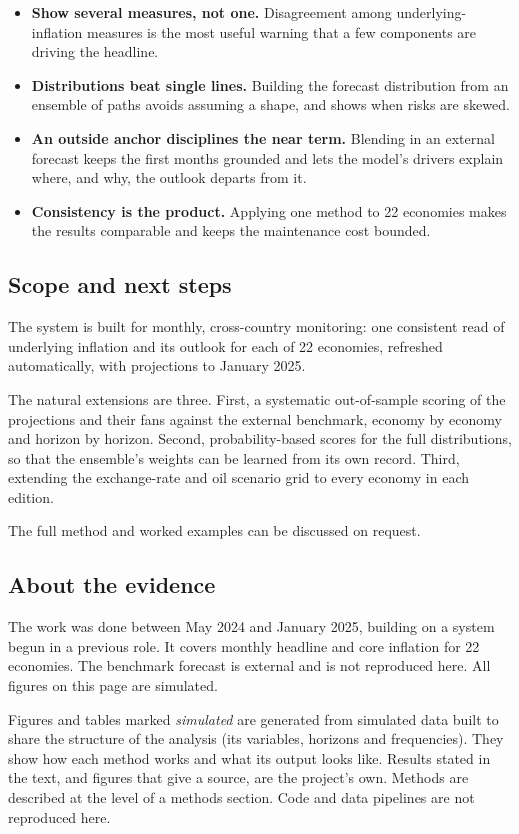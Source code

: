 \documentclass[
  british,
  a4paper,
]{article}
\providecommand{\tightlist}{%
  \setlength{\itemsep}{0pt}\setlength{\parskip}{0pt}}
\begin{document}
\begin{itemize}
\tightlist
\item
  \textbf{Show several measures, not one.} Disagreement among
  underlying-inflation measures is the most useful warning that a few
  components are driving the headline.
\item
  \textbf{Distributions beat single lines.} Building the forecast
  distribution from an ensemble of paths avoids assuming a shape, and
  shows when risks are skewed.
\item
  \textbf{An outside anchor disciplines the near term.} Blending in an
  external forecast keeps the first months grounded and lets the model's
  drivers explain where, and why, the outlook departs from it.
\item
  \textbf{Consistency is the product.} Applying one method to 22
  economies makes the results comparable and keeps the maintenance cost
  bounded.
\end{itemize}

\subsection{Scope and next steps}\label{scope-and-next-steps}

The system is built for monthly, cross-country monitoring: one
consistent read of underlying inflation and its outlook for each of 22
economies, refreshed automatically, with projections to January 2025.

The natural extensions are three. First, a systematic out-of-sample
scoring of the projections and their fans against the external
benchmark, economy by economy and horizon by horizon. Second,
probability-based scores for the full distributions, so that the
ensemble's weights can be learned from its own record. Third, extending
the exchange-rate and oil scenario grid to every economy in each
edition.

The full method and worked examples can be discussed on request.

\subsection{About the evidence}\label{about-the-evidence}

The work was done between May 2024 and January 2025, building on a
system begun in a previous role. It covers monthly headline and core
inflation for 22 economies. The benchmark forecast is external and is
not reproduced here. All figures on this page are simulated.

Figures and tables marked \emph{simulated} are generated from simulated
data built to share the structure of the analysis (its variables,
horizons and frequencies). They show how each method works and what its
output looks like. Results stated in the text, and figures that give a
source, are the project's own. Methods are described at the level of a
methods section. Code and data pipelines are not reproduced here.
\end{document}
